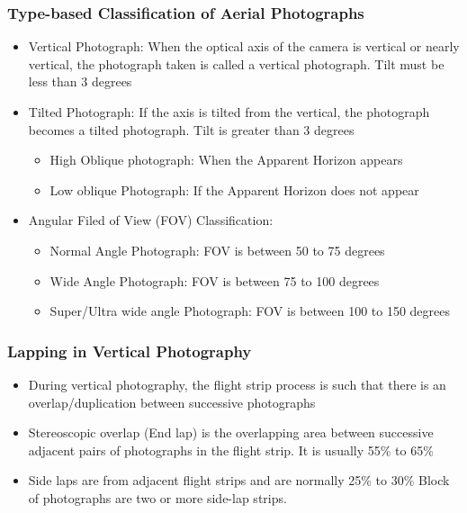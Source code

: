 \documentclass[11pt,twocolumn,letterpaper]{article}
\begin{document}
\subsubsection{Type-based Classification of Aerial Photographs}
\begin{itemize}
\item Vertical Photograph:
When the optical axis of the camera is vertical or nearly vertical, the photograph taken is called a vertical photograph. Tilt must be less than 3 degrees


\item Tilted Photograph:
If the axis is tilted from the vertical, the photograph becomes a tilted photograph. Tilt is greater than 3 degrees

\begin{itemize}
\item High Oblique photograph: When the Apparent Horizon appears
\item  Low oblique Photograph: If the Apparent Horizon does not appear

\end{itemize}

\item Angular Filed of View (FOV) Classification:
\begin{itemize}
    \item Normal Angle Photograph: FOV is between 50 to 75 degrees
    \item Wide Angle Photograph: FOV is between 75 to 100 degrees
    \item Super/Ultra wide angle Photograph: FOV is between 100 to 150 degrees
\end{itemize}



\end{itemize}

\subsubsection{Lapping in Vertical Photography}
\begin{itemize}
    \item During vertical photography, the flight strip process is such that there is an overlap/duplication between successive photographs
    \item Stereoscopic overlap (End lap) is the overlapping area between successive adjacent pairs of photographs in the flight strip. It is usually 55\% to 65\%
    \item Side laps are from adjacent flight strips and are normally 25\% to 30\%
    \tem Block of photographs are two or more side-lap strips.
\end{itemize}
\end{document}
